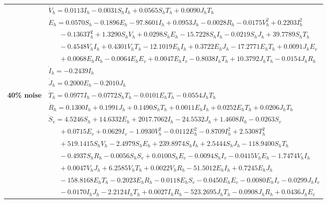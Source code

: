 \documentclass[9pt]{article}
\numberwithin{equation}{section}
\begin{document}
\begin{table}[ht]
\begin{tabularx}{1\linewidth}{|l|X|}
        & $\dot{V}_h=0.0113I_h-0.0031S_hI_h+0.0565S_hT_h+0.0090J_hT_h$ \\
        & $\dot{E}_h=0.0570S_h-0.1896E_h-97.8601I_h+0.0953J_h-0.0028R_h-0.0175V_h^2+0.2203I_h^2$ \\
        & $\quad\;\;-0.1363T_h^2+1.3290S_hV_h+0.0298S_hE_h-15.7228S_hI_h-0.0219S_hJ_h+39.7789S_hT_h$ \\
        & $\quad\;\;-0.4548V_hI_h+0.4301V_hT_h-12.1019E_hI_h+0.3722E_hJ_h-17.2771E_hT_h+0.0091J_hE_v$ \\
        & $\quad\;\;+0.0068E_hR_h-0.0064E_hE_v+0.0047E_hI_v-0.8038I_hT_h+10.3792J_hT_h-0.0154J_hR_h$ \\
        & $\dot{I}_h=-0.2439I_h$ \\
        & $\dot{J}_h=0.2000E_h-0.2010J_h$ \\
        \textbf{40\% noise} & $\dot{T}_h=0.0977I_h-0.0772S_hT_h-0.0101E_hT_h-0.0554J_hT_h$ \\
        & $\dot{R}_h=0.1300I_h+0.1991J_h+0.1490S_hT_h+0.0011E_hI_h+0.0252E_hT_h+0.0206J_hT_h$ \\
        & $\dot{S}_v=4.5246S_h+14.6332E_h+2017.7062I_h-24.5532J_h+1.4608R_h-0.0263S_v$ \\
        & $\quad\;\;+0.0715E_v+0.0629I_v-1.0930V_h^2-0.0112E_h^2-0.8709I_h^2+2.5308T_h^2$ \\
        & $\quad\;\;+519.1415S_hV_h-2.4979S_hE_h+239.8974S_hI_h+2.5444S_hJ_h-118.9400S_hT_h$ \\
        & $\quad\;\;-0.4937S_hR_h-0.0056S_hS_v+0.0100S_hE_v-0.0094S_hI_v-0.0415V_hE_h-1.7474V_hI_h$ \\
        & $\quad\;\;+0.0047V_hJ_h+6.2585V_hT_h+0.0022V_hR_h-51.5012E_hI_h+0.7245E_hJ_h$ \\
        & $\quad\;\;-158.8168E_hT_h-0.2023E_hR_h-0.0118E_hS_v-0.0450E_hE_v-0.0080E_hI_v-0.0299J_hI_v$ \\
        & $\quad\;\;-0.0170I_hJ_h-2.2124I_hT_h+0.0027I_hR_h-523.2695J_hT_h-0.0908J_hR_h+0.0436J_hE_v$ \\
    \end{tabularx}
\end{table}
\end{document}
